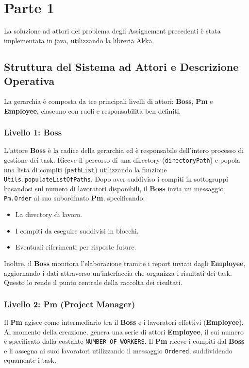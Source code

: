 \chapter{Parte 1}
\label{ch:into} %

La soluzione ad attori del problema degli Assignement precedenti è stata implementata in java, utilizzando la libreria Akka.

\section*{Struttura del Sistema ad Attori e Descrizione Operativa}

La gerarchia è composta da tre principali livelli di attori: \textbf{Boss}, \textbf{Pm} e \textbf{Employee}, ciascuno con ruoli e responsabilità ben definiti.

\subsection*{Livello 1: Boss}
L'attore \textbf{Boss} è la radice della gerarchia ed è responsabile dell'intero processo di gestione dei task. Riceve il percorso di una directory (\texttt{directoryPath}) e popola una lista di compiti (\texttt{pathList}) utilizzando la funzione \texttt{Utils.populateListOfPaths}. Dopo aver suddiviso i compiti in sottogruppi basandosi sul numero di lavoratori disponibili, il \textbf{Boss} invia un messaggio \texttt{Pm.Order} al suo subordinato \textbf{Pm}, specificando:
\begin{itemize}
    \item La directory di lavoro.
    \item I compiti da eseguire suddivisi in blocchi.
    \item Eventuali riferimenti per risposte future.
\end{itemize}

Inoltre, il \textbf{Boss} monitora l'elaborazione tramite i report inviati dagli \textbf{Employee}, aggiornando i dati attraverso un’interfaccia che organizza i risultati dei task. Questo lo rende il punto centrale della raccolta dei risultati.

\subsection*{Livello 2: Pm (Project Manager)}
Il \textbf{Pm} agisce come intermediario tra il \textbf{Boss} e i lavoratori effettivi (\textbf{Employee}). Al momento della creazione, genera una serie di attori \textbf{Employee}, il cui numero è specificato dalla costante \texttt{NUMBER\_OF\_WORKERS}. Il \textbf{Pm} riceve i compiti dal \textbf{Boss} e li assegna ai suoi lavoratori utilizzando il messaggio \texttt{Ordered}, suddividendo equamente i task.  

